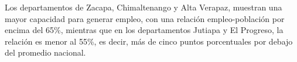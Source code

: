 Los departamentos de Zacapa, Chimaltenango y Alta Verapaz, muestran una mayor capacidad para generar empleo, con una relación empleo-población por encima del 65\%, mientras que en los departamentos Jutiapa y El Progreso, la relación es menor al 55\%, es decir, más de cinco puntos porcentuales por debajo del promedio nacional.